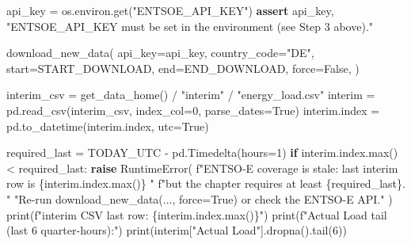\documentclass[
  english,
  letterpaper,
]{scrbook}
\newenvironment{Shaded}{\begin{snugshade}}{\end{snugshade}}
\newcommand{\BuiltInTok}[1]{\textcolor[rgb]{0.00,0.23,0.31}{#1}}
\newcommand{\ControlFlowTok}[1]{\textcolor[rgb]{0.00,0.23,0.31}{\textbf{#1}}}
\newcommand{\DecValTok}[1]{\textcolor[rgb]{0.68,0.00,0.00}{#1}}
\newcommand{\NormalTok}[1]{\textcolor[rgb]{0.00,0.23,0.31}{#1}}
\newcommand{\OperatorTok}[1]{\textcolor[rgb]{0.37,0.37,0.37}{#1}}
\newcommand{\PreprocessorTok}[1]{\textcolor[rgb]{0.68,0.00,0.00}{#1}}
\newcommand{\SpecialCharTok}[1]{\textcolor[rgb]{0.37,0.37,0.37}{#1}}
\newcommand{\SpecialStringTok}[1]{\textcolor[rgb]{0.13,0.47,0.30}{#1}}
\newcommand{\StringTok}[1]{\textcolor[rgb]{0.13,0.47,0.30}{#1}}
\newcommand{\VariableTok}[1]{\textcolor[rgb]{0.07,0.07,0.07}{#1}}
\begin{document}
\protect{}\label{live-download}
\begin{Shaded}
\begin{Highlighting}[]
\NormalTok{api\_key }\OperatorTok{=}\NormalTok{ os.environ.get(}\StringTok{"ENTSOE\_API\_KEY"}\NormalTok{)}
\ControlFlowTok{assert}\NormalTok{ api\_key, }\StringTok{"ENTSOE\_API\_KEY must be set in the environment (see Step 3 above)."}

\NormalTok{download\_new\_data(}
\NormalTok{    api\_key}\OperatorTok{=}\NormalTok{api\_key,}
\NormalTok{    country\_code}\OperatorTok{=}\StringTok{"DE"}\NormalTok{,}
\NormalTok{    start}\OperatorTok{=}\NormalTok{START\_DOWNLOAD,}
\NormalTok{    end}\OperatorTok{=}\NormalTok{END\_DOWNLOAD,}
\NormalTok{    force}\OperatorTok{=}\VariableTok{False}\NormalTok{,}
\NormalTok{)}

\NormalTok{interim\_csv }\OperatorTok{=}\NormalTok{ get\_data\_home() }\OperatorTok{/} \StringTok{"interim"} \OperatorTok{/} \StringTok{"energy\_load.csv"}
\NormalTok{interim }\OperatorTok{=}\NormalTok{ pd.read\_csv(interim\_csv, index\_col}\OperatorTok{=}\DecValTok{0}\NormalTok{, parse\_dates}\OperatorTok{=}\VariableTok{True}\NormalTok{)}
\NormalTok{interim.index }\OperatorTok{=}\NormalTok{ pd.to\_datetime(interim.index, utc}\OperatorTok{=}\VariableTok{True}\NormalTok{)}

\NormalTok{required\_last }\OperatorTok{=}\NormalTok{ TODAY\_UTC }\OperatorTok{{-}}\NormalTok{ pd.Timedelta(hours}\OperatorTok{=}\DecValTok{1}\NormalTok{)}
\ControlFlowTok{if}\NormalTok{ interim.index.}\BuiltInTok{max}\NormalTok{() }\OperatorTok{\textless{}}\NormalTok{ required\_last:}
    \ControlFlowTok{raise} \PreprocessorTok{RuntimeError}\NormalTok{(}
        \SpecialStringTok{f"ENTSO{-}E coverage is stale: last interim row is }\SpecialCharTok{\{}\NormalTok{interim}\SpecialCharTok{.}\NormalTok{index}\SpecialCharTok{.}\BuiltInTok{max}\NormalTok{()}\SpecialCharTok{\}}\SpecialStringTok{ "}
        \SpecialStringTok{f"but the chapter requires at least }\SpecialCharTok{\{}\NormalTok{required\_last}\SpecialCharTok{\}}\SpecialStringTok{. "}
        \StringTok{"Re{-}run download\_new\_data(..., force=True) or check the ENTSO{-}E API."}
\NormalTok{    )}
\BuiltInTok{print}\NormalTok{(}\SpecialStringTok{f"interim CSV last row: }\SpecialCharTok{\{}\NormalTok{interim}\SpecialCharTok{.}\NormalTok{index}\SpecialCharTok{.}\BuiltInTok{max}\NormalTok{()}\SpecialCharTok{\}}\SpecialStringTok{"}\NormalTok{)}
\BuiltInTok{print}\NormalTok{(}\SpecialStringTok{f"Actual Load tail (last 6 quarter{-}hours):"}\NormalTok{)}
\BuiltInTok{print}\NormalTok{(interim[}\StringTok{"Actual Load"}\NormalTok{].dropna().tail(}\DecValTok{6}\NormalTok{))}
\end{Highlighting}
\end{Shaded}
\end{document}
